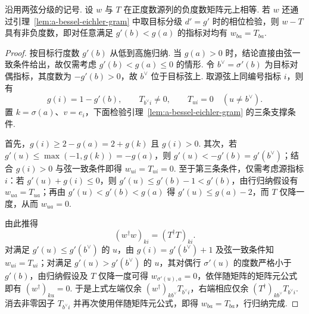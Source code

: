 \begin{lemma}[目标分级下通过幂幺检验的弦类]
\label{lem:a-bessel-surviving-chord-class}
\emitthmsource
沿用两弦分级的记号. 设 $w$ 与 $T$ 在正度数源列的负度数矩阵元上相等. 若 $w$ 还通过引理~\ref{lem:a-bessel-eichler-gram} 中取目标分级 $d'=g'$ 时的相位检验，则 $w-T$ 具有非负度数，即对任意满足 $g'(b)<g(a)$ 的指标对均有 $w_{ba}=T_{ba}$.
\end{lemma}
\begin{proof}
按目标行度数 $g'(b)$ 从低到高施归纳. 当 $g(a)>0$ 时，结论直接由弦一致条件给出，故仅需考虑 $g'(b)<g(a)\le0$ 的情形. 令 $b^\vee=\sigma'(b)$ 为目标对偶指标，其度数为 $-g'(b)>0$，故 $b^\vee$ 位于目标弦上. 取源弦上同编号指标 $i$，则有
\[
 g(i)=1-g'(b),\qquad T_{b^\vee i}\ne0,\qquad
       T_{u i}=0\quad(u\ne b^\vee).
\]
置 $k=\sigma(a)$、$v=e_i$，下面检验引理~\ref{lem:a-bessel-eichler-gram} 的三条支撑条件.

首先，$g(i)\ge2-g(a)=2+g(k)$ 且 $g(i)>0$. 其次，若 $g'(u)\le\max(-1,g(k))=-g(a)$，则 $g'(u)<-g'(b)=g'(b^\vee)$；结合 $g(i)>0$ 与弦一致条件即得 $w_{ui}=T_{ui}=0$. 至于第三条条件，仅需考虑源指标 $i$：若 $g'(u)+g(i)\le0$，则 $g'(u)\le g'(b)-1<g'(b)$，由行归纳假设有 $w_{ua}=T_{ua}$；再由 $g'(u)<g'(b)<g(a)$ 得 $g'(u)\le g(a)-2$，而 $T$ 仅降一度，从而 $w_{ua}=0$.

由此推得
\[
 (w^\dagger w)_{ki}=(T^\dagger T)_{ki}.
\]
对满足 $g'(u)\le g'(b^\vee)$ 的 $u$，由 $g(i)=g'(b^\vee)+1$ 及弦一致条件知 $w_{ui}=T_{ui}$；对满足 $g'(u)>g'(b^\vee)$ 的 $u$，其对偶行 $\sigma'(u)$ 的度数严格小于 $g'(b)$，由归纳假设及 $T$ 仅降一度可得 $w_{\sigma'(u),a}=0$，依伴随矩阵的矩阵元公式即有 $(w^\dagger)_{k u}=0$. 于是上式左端仅余 $(w^\dagger)_{k b^\vee}T_{b^\vee i}$，右端相应仅余 $(T^\dagger)_{k b^\vee}T_{b^\vee i}$. 消去非零因子 $T_{b^\vee i}$ 并再次使用伴随矩阵元公式，即得 $w_{ba}=T_{ba}$，行归纳完成.
\end{proof}

